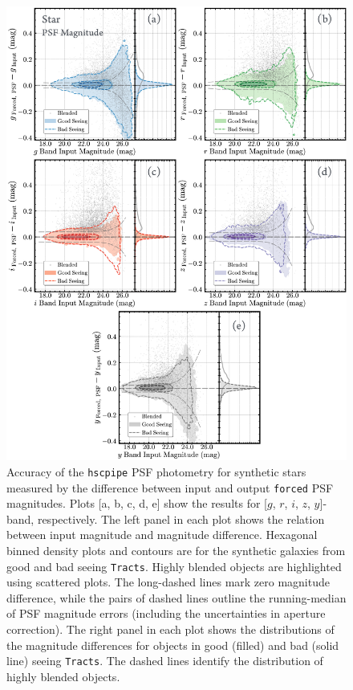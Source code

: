 \documentclass[useamsfonts]{pasj01}
\def\forced{\texttt{forced}}
\def\tracts{\texttt{Tracts}}
\begin{document}
\begin{figure}
    \begin{center}
        \includegraphics[width=16cm]{fig/synpipe_psf_mag}
    \end{center}
    \caption{
        Accuracy of the \texttt{hscpipe} PSF photometry for synthetic stars measured
        by the difference between input and output \forced{} PSF magnitudes.
        Plots [a, b, c, d, e] show the results for [$g$, $r$, $i$, $z$, $y$]-band, respectively.
        The left panel in each plot shows the relation between input magnitude and
        magnitude difference.
        Hexagonal binned density plots and contours are for the synthetic galaxies from
        good and bad seeing \tracts{}.
        Highly blended objects are highlighted using scattered plots.
        The long-dashed lines mark zero magnitude difference, while the pairs of
        dashed lines outline the running-median of PSF magnitude errors
        (including the uncertainties in aperture correction).
        The right panel in each plot shows the distributions of the magnitude differences for objects
        in good (filled) and bad (solid line) seeing \tracts{}.
        The dashed lines identify the distribution of highly blended objects.
        }
    \label{fig:psf_mag}
\end{figure}
\end{document}
